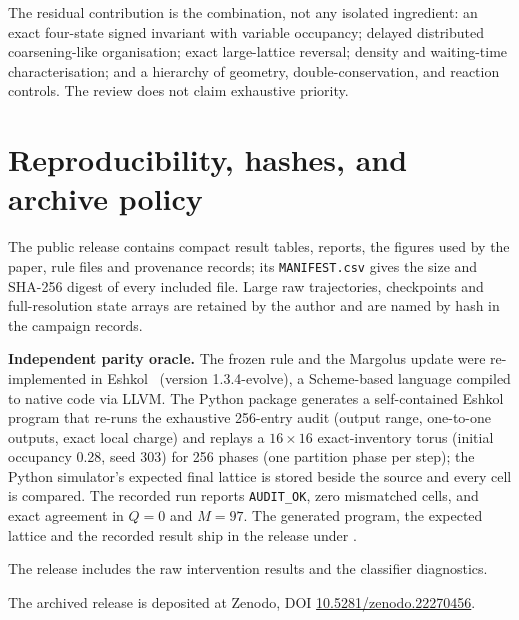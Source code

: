 \documentclass[11pt,a4paper]{article}
\newcommand{\code}[1]{\texttt{#1}}
\begin{document}
The residual contribution is the combination, not any isolated ingredient: an exact four-state signed invariant with variable occupancy; delayed distributed coarsening-like organisation; exact large-lattice reversal; density and waiting-time characterisation; and a hierarchy of geometry, double-conservation, and reaction controls. The review does not claim exhaustive priority.

\section{Reproducibility, hashes, and archive policy}
The public release contains compact result tables, reports, the figures used by the paper, rule files and provenance records; its \code{MANIFEST.csv} gives the size and SHA-256 digest of every included file. Large raw trajectories, checkpoints and full-resolution state arrays are retained by the author and are named by hash in the campaign records.

\textbf{Independent parity oracle.} The frozen rule and the Margolus update were re-implemented in Eshkol~\citep{Tsotchke2026Eshkol} (version 1.3.4-evolve), a Scheme-based language compiled to native code via LLVM. The Python package generates a self-contained Eshkol program that re-runs the exhaustive 256-entry audit (output range, one-to-one outputs, exact local charge) and replays a $16\times16$ exact-inventory torus (initial occupancy 0.28, seed 303) for 256 phases (one partition phase per step); the Python simulator's expected final lattice is stored beside the source and every cell is compared. The recorded run reports \code{AUDIT\_OK}, zero mismatched cells, and exact agreement in $Q=0$ and $M=97$. The generated program, the expected lattice and the recorded result ship in the release under .

\begingroup\sloppy The release includes the raw intervention results and the classifier diagnostics.\par\endgroup

The archived release is deposited at Zenodo, DOI \href{https://doi.org/10.5281/zenodo.22270456}{\mbox{10.5281/zenodo.22270456}}.

\footnotesize


\end{document}
